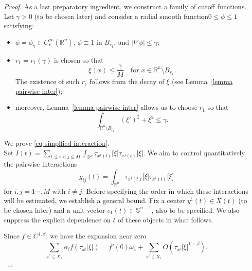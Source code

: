 \documentclass[11pt,letterpaper,reqno]{amsart}
\newcommand{\R}{\mathbb{R}}
\theoremstyle{plain}%
\theoremstyle{definition}
\numberwithin{equation}{section}
\numberwithin{figure}{section}
\begin{document}
\begin{proof}
As a last preparatory ingredient, we construct a family of cutoff functions. Let $\gamma>0$ (to be chosen later) and consider a radial smooth function$0\le \phi\le 1$ satisfying:
\begin{itemize}
\item $\phi=\phi_\gamma\in C_c^\infty(\R^n)$, 
      $\phi\equiv 1$ in $B_{r_1}$, and 
      $|\nabla\phi|\le\gamma$;
\item $r_1=r_1(\gamma)$ is chosen so that
\begin{equation}
\label{eq bound bump}
\xi(x) \le \frac{\gamma}{M}
\quad \text{for } x\in \R^n\setminus B_{r_1}.
\end{equation}
The existence of such $r_1$ follows from the decay of $\xi$ (see Lemma~\ref{lemma pairwise inter});

\item moreover, Lemma~\ref{lemma pairwise inter} allows us to choose $r_1$ so that
\begin{equation}
\label{eq L1 bound bump}
\int_{\R^n\setminus B_{r_1}}
(\xi')^2 + \xi^2
\le \gamma.
\end{equation}
\end{itemize}

\medskip

 We prove \eqref{eq simplfied interaction}.\\

Set $I(t) =  \sum_{1\leq i < j \leq M}\int_{\R^n}\tau_{x^i(t)}\big[\xi\big]\tau_{x^j(t)}\big[\xi\big]$. We aim to control quantitatively the pairwise interactions
\begin{equation}\label{eq pairwise interaction}
	g_{ij}(t) = \int_{\R^n} \tau_{x^j(t)}\big[\xi\big] \tau_{x^i(t)}\big[\xi\big]
\end{equation}
 for $i, j =1\cdots , M$ with $i \neq j$. Before specifying the order in which these interactions will be estimated, we establish a general bound. Fix a center $y^1(t)\in X(t)$ (to be chosen later) and a unit vector $e_1(t)\in\mathbb{S}^{n-1}$, also to be specified. We also suppress the explicit dependence on $t$ of these objects in what follows.

Since $f\in C^{1,\beta}$, we have the expansion near zero
\begin{equation}\label{eq lin at 0}
	\sum_{x^i \in X_1} \alpha_i f(\tau_{x^i}\big[\xi\big]) = f'(0)\omega_{1}+ \sum_{x^i \in X_1}O(\tau_{x^i}\big[\xi\big]^{1+\beta}).
\end{equation}


\end{proof}
\end{document}
